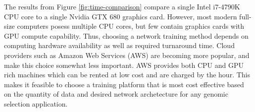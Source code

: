 The results from Figure \ref{fig:time-comparison} compare a single Intel i7-4790K CPU core to a single Nvidia GTX 680 graphics card.
However, most modern full-size computers posess multiple CPU cores, but few contain graphics cards with GPU compute capability. 
Thus, choosing a network training method depends on computing hardware availability as well as required turnaround time. Cloud providers such 
as Amazon Web Services (AWS) are becoming more popular, and make this choice somewhat less important. AWS provides both CPU and GPU rich 
machines which can be rented at low cost and are charged by the hour. This makes it feasible to choose a training platform 
that is most cost effective based on the quantity of data and desired network archetecture for any genomic selection application.

\ifdefined\showtablesandfigures
\fi

